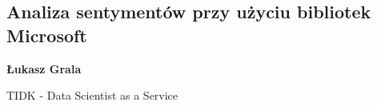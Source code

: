 \documentclass[\main/boa.tex]{subfiles}
\begin{document}
\subsection{Analiza sentymentów przy użyciu bibliotek Microsoft}

\begin{minipage}{0.915\textwidth}
	\centering
  {\bf {} Łukasz Grala}
\end{minipage}

\vskip 0.3cm

\begin{affiliations}
\begin{minipage}{0.915\textwidth}
\centering
TIDK - Data Scientist as a Service  \\[-2pt]
\end{minipage}
\end{affiliations}

\vskip 0.8cm
\end{document}
